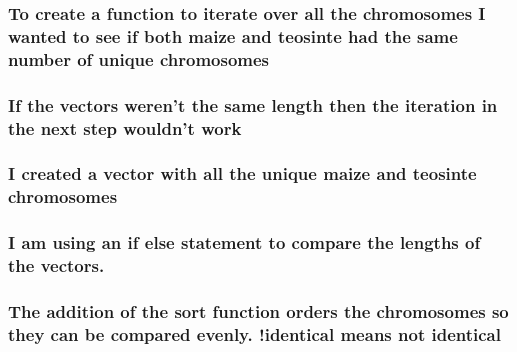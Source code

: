 \documentclass[
]{article}
\newenvironment{Shaded}{\begin{snugshade}}{\end{snugshade}}
\newcommand{\FunctionTok}[1]{\textcolor[rgb]{0.13,0.29,0.53}{\textbf{#1}}}
\newcommand{\NormalTok}[1]{#1}
\newcommand{\OtherTok}[1]{\textcolor[rgb]{0.56,0.35,0.01}{#1}}
\newcommand{\SpecialCharTok}[1]{\textcolor[rgb]{0.81,0.36,0.00}{\textbf{#1}}}
\begin{document}
\subsubsection{To create a function to iterate over all the chromosomes
I wanted to see if both maize and teosinte had the same number of unique
chromosomes}\label{to-create-a-function-to-iterate-over-all-the-chromosomes-i-wanted-to-see-if-both-maize-and-teosinte-had-the-same-number-of-unique-chromosomes}

\subsubsection{If the vectors weren't the same length then the iteration
in the next step wouldn't
work}\label{if-the-vectors-werent-the-same-length-then-the-iteration-in-the-next-step-wouldnt-work}

\subsubsection{I created a vector with all the unique maize and teosinte
chromosomes}\label{i-created-a-vector-with-all-the-unique-maize-and-teosinte-chromosomes}

\begin{Shaded}
\end{Shaded}

\subsubsection{I am using an if else statement to compare the lengths of
the
vectors.}\label{i-am-using-an-if-else-statement-to-compare-the-lengths-of-the-vectors.}

\subsubsection{The addition of the sort function orders the chromosomes
so they can be compared evenly. !identical means not
identical}\label{the-addition-of-the-sort-function-orders-the-chromosomes-so-they-can-be-compared-evenly.-identical-means-not-identical}
\end{document}
